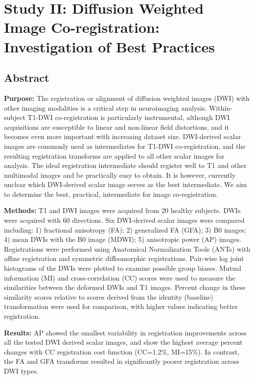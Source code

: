 \graphicspath{{images/ap-reg/}}

\chapter{Study II: Diffusion Weighted Image Co-registration: Investigation of Best Practices}
\label{section:study2}


\section{Abstract}

\textbf{Purpose:} The registration or alignment of diffusion weighted images (DWI) with other imaging modalities is a critical step in neuroimaging analysis. Within-subject T1-DWI co-registration is particularly instrumental, although DWI acquisitions are susceptible to linear and non-linear field distortions, and it becomes even more important with increasing dataset size. DWI-derived scalar images are commonly used as intermediates for T1-DWI co-registration, and the resulting registration transforms are applied to all other scalar images for analysis. The ideal registration intermediate should register well to T1 and other multimodal images and be practically easy to obtain. It is however, currently unclear which DWI-derived scalar image serves as the best intermediate. We aim to determine the best, practical, intermediate for image co-registration. 

\textbf{Methods:} T1 and DWI images were acquired from 20 healthy subjects. DWIs were acquired with 60 directions.  Six DWI-derived scalar images were compared including: 1) fractional anisotropy (FA); 2) generalized FA (GFA); 3) B0 images; 4) mean DWIs with the B0 image (MDWI); 5) anisotropic power (AP) images. Registrations were performed using Anatomical Normalization Tools (ANTs) with affine registration and symmetric diffeomorphic registrations. Pair-wise log joint histograms of the DWIs were plotted to examine possible group biases. Mutual information (MI) and cross-correlation (CC) scores were used to measure the similarities between the deformed DWIs and T1 images. Percent change in these similarity scores relative to scores derived from the identity (baseline) transformation were used for comparison, with higher values indicating better registration.

\textbf{Results:} AP showed the smallest variability in registration improvements across all the tested DWI derived scalar images, and show the highest average percent changes with CC registration cost function (CC=1.2\%, MI=15\%). In contrast, the FA and GFA transforms resulted in significantly poorer registration across DWI types. 

